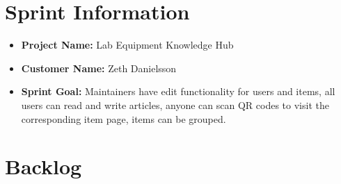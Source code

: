 \section*{Sprint Information}

\begin{itemize}[noitemsep]
    \item \textbf{Project Name:} Lab Equipment Knowledge Hub
    \item \textbf{Customer Name:} Zeth Danielsson
    \item \textbf{Sprint Goal:} Maintainers have edit functionality for users and items, all users can read and write articles, anyone can scan QR codes to visit the corresponding item page, items can be grouped.
\end{itemize}

\section*{Backlog}

